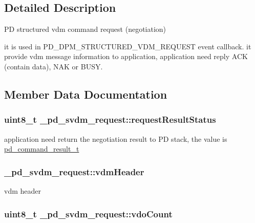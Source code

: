\subsection{Detailed Description}
P\-D structured vdm command request (negotiation) 

it is used in P\-D\-\_\-\-D\-P\-M\-\_\-\-S\-T\-R\-U\-C\-T\-U\-R\-E\-D\-\_\-\-V\-D\-M\-\_\-\-R\-E\-Q\-U\-E\-S\-T event callback. it provide vdm message information to application, application need reply A\-C\-K (contain data), N\-A\-K or B\-U\-S\-Y. 

\subsection{Member Data Documentation}
\hypertarget{struct__pd__svdm__request_a234e68f92801246ea761e56aa163c3e6}{
\subsubsection[{request\-Result\-Status}]{\setlength{\rightskip}{0pt plus 5cm}uint8\-\_\-t \-\_\-pd\-\_\-svdm\-\_\-request\-::request\-Result\-Status}}\label{struct__pd__svdm__request_a234e68f92801246ea761e56aa163c3e6}
application need return the negotiation result to P\-D stack, the value is \hyperlink{group__usb__pd__stack_ga59917b1485caba4dd8d9b65ca5a5fd92}{pd\-\_\-command\-\_\-result\-\_\-t} \hypertarget{struct__pd__svdm__request_a502097a71d336575e7c64feded3fc3d1}{
\subsubsection[{vdm\-Header}]{ \-\_\-pd\-\_\-svdm\-\_\-request\-::vdm\-Header}}\label{struct__pd__svdm__request_a502097a71d336575e7c64feded3fc3d1}
vdm header \hypertarget{struct__pd__svdm__request_a447ad7fabf845dde656f32b7ba306582}{
\subsubsection[{vdo\-Count}]{\setlength{\rightskip}{0pt plus 5cm}uint8\-\_\-t \-\_\-pd\-\_\-svdm\-\_\-request\-::vdo\-Count}}\label{struct__pd__svdm__request_a447ad7fabf845dde656f32b7ba306582}

